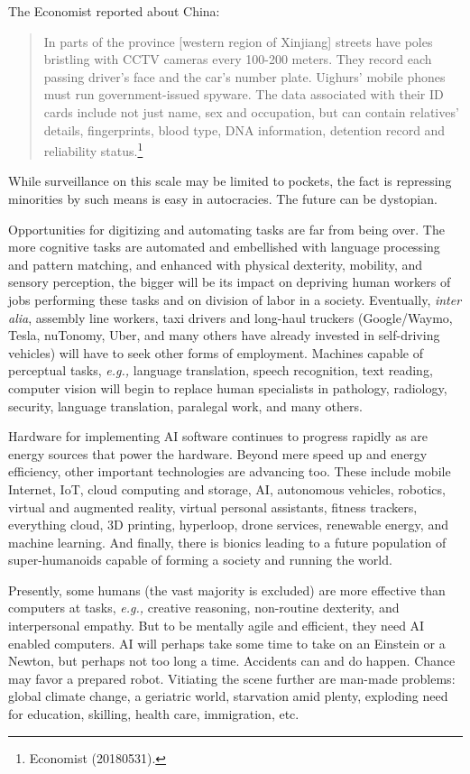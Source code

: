 \begin{multicols}{2}
The Economist reported about China:

\begin{quote}
In parts of the province [western region of Xinjiang] streets have poles bristling with CCTV cameras every 100-200 meters. They record each passing driver's face and the car's number plate. Uighurs’ mobile phones must run government-issued spyware. The data associated with their ID cards include not just name, sex and occupation, but can contain relatives’ details, fingerprints, blood type, DNA information, detention record and reliability status.\footnote{Economist (20180531).}
\end{quote}

While surveillance on this scale may be limited to pockets, the fact is repressing minorities by such means is easy in autocracies. The future can be dystopian.

Opportunities for digitizing and automating tasks are far from being over. The more cognitive tasks are automated and embellished with language processing and pattern matching, and enhanced with physical dexterity, mobility, and sensory perception, the bigger will be its impact on depriving human workers of jobs performing these tasks and on division of labor in a society. Eventually, \textit{inter alia}, assembly line workers, taxi drivers and long-haul truckers (Google/Waymo, Tesla, nuTonomy, Uber, and many others have already invested in self-driving vehicles) will have to seek other forms of employment. Machines capable of perceptual tasks, \textit{e.g.,} language translation, speech recognition, text reading, computer vision will begin to replace human specialists in pathology, radiology, security, language translation, paralegal work, and many others.

Hardware for implementing AI software continues to progress rapidly as are energy sources that power the hardware. Beyond mere speed up and energy efficiency, other important technologies are advancing too. These include mobile Internet, IoT, cloud computing and storage, AI, autonomous vehicles, robotics, virtual and augmented reality, virtual personal assistants, fitness trackers, everything cloud, 3D printing, hyperloop, drone services, renewable energy, and machine learning. And finally, there is bionics leading to a future population of super-humanoids capable of forming a society and running the world.

Presently, some humans (the vast majority is excluded) are more effective than computers at tasks, \textit{e.g.,} creative reasoning, non-routine dexterity, and interpersonal empathy. But to be mentally agile and efficient, they need AI enabled computers. AI will perhaps take some time to take on an Einstein or a Newton, but perhaps not too long a time. Accidents can and do happen. Chance may favor a prepared robot. Vitiating the scene further are man-made problems: global climate change, a geriatric world, starvation amid plenty, exploding need for education, skilling, health care, immigration, etc. 


\end{multicols}
